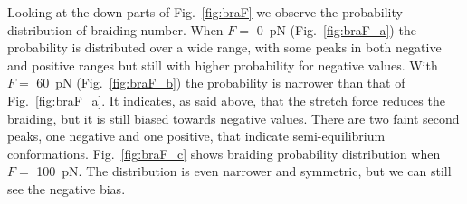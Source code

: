 \documentclass[a4paper,10pt]{article}
\begin{document}
Looking at the down parts of Fig.~\ref{fig:braF} we observe the probability distribution of braiding number.
When $F=$ \SI{0}{\pico\newton} (Fig.~\ref{fig:braF_a}) the probability is distributed over a wide range, with some peaks in both negative and positive ranges but still with higher probability for negative values.
With $F=$ \SI{60}{\pico\newton} (Fig.~\ref{fig:braF_b}) the probability is narrower than that of Fig.~\ref{fig:braF_a}.
It indicates, as said above, that the stretch force reduces the braiding, but it is still biased towards negative values.
There are two faint second peaks, one negative and one positive, that indicate semi-equilibrium conformations.
Fig.~\ref{fig:braF_c} shows braiding probability distribution when $F=$ \SI{100}{\pico\newton}.
The distribution is even narrower and symmetric, but we can still see the negative bias.
\end{document}
